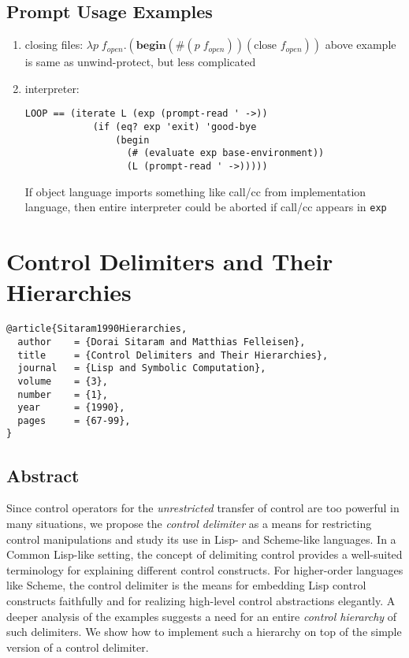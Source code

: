 \documentclass[letterpaper]{llncs}
\begin{document}
\subsection*{Prompt Usage Examples}
\begin{enumerate}
	\item closing files: $\lambda p \; f_{open}.(\textbf{begin} (\#(p \; f_{open})) (\textrm{close } f_{open}))$
	above example is same as unwind-protect, but less complicated
	\item interpreter: 
\begin{verbatim}
LOOP == (iterate L (exp (prompt-read ' ->))
	        (if (eq? exp 'exit) 'good-bye
	            (begin
	              (# (evaluate exp base-environment))
	              (L (prompt-read ' ->)))))
\end{verbatim}
If object language imports something like call/cc from implementation language, then entire interpreter could be aborted if call/cc appears in \texttt{exp}
\end{enumerate}


\section*{Control Delimiters and Their Hierarchies}%

\begin{verbatim}
@article{Sitaram1990Hierarchies,
  author    = {Dorai Sitaram and Matthias Felleisen},
  title     = {Control Delimiters and Their Hierarchies},
  journal   = {Lisp and Symbolic Computation},
  volume    = {3},
  number    = {1},
  year      = {1990},
  pages     = {67-99},
}
\end{verbatim}

\subsection*{Abstract}
Since control operators for the \textit{unrestricted} transfer of control are too powerful in many situations, we propose the \textit{control delimiter} as a means for restricting control manipulations and study its use in Lisp- and Scheme-like languages. In a Common Lisp-like setting, the concept of delimiting control provides a well-suited terminology for explaining different control constructs. For higher-order languages like Scheme, the control delimiter is the means for embedding Lisp control constructs faithfully and for realizing high-level control abstractions elegantly. A deeper analysis of the examples suggests a need for an entire \textit{control hierarchy} of such delimiters. We show how to implement such a hierarchy on top of the simple version of a control delimiter.
\end{document}
